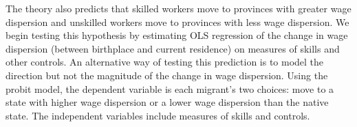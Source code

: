 \documentclass{article}
\begin{document}
The theory also predicts that skilled workers move to provinces with greater wage dispersion and unskilled workers move to provinces with less wage dispersion. We begin testing this hypothesis by estimating OLS regression of the change in wage dispersion (between birthplace and current residence) on measures of skills and other controls. An alternative way of testing this prediction is to model the direction but not the magnitude of the change in wage dispersion. Using the probit model, the dependent variable is each migrant's two choices: move to a state with higher wage dispersion or a lower wage dispersion than the native state. The independent variables include measures of skills and controls.\\\\







\end{document}

